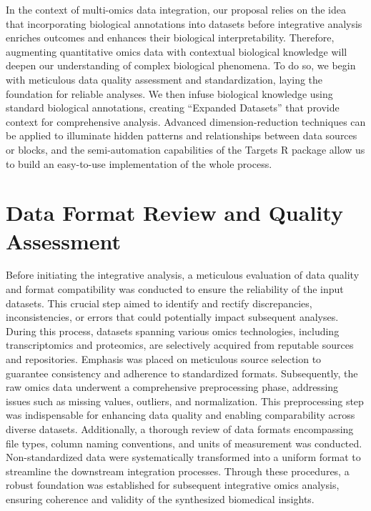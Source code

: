 \documentclass[a4paper, nobind]{templates/ociamthesis}
\renewcommand{\chaptermark}[1]{\markboth{\thechapter. #1}{\thechapter. #1}}
\begin{document}
\chaptermark{Methodology}

\minitoc 

In the context of multi-omics data integration, our proposal relies on the idea that incorporating biological annotations into datasets before integrative analysis enriches outcomes and enhances their biological interpretability. Therefore, augmenting quantitative omics data with contextual biological knowledge will deepen our understanding of complex biological phenomena. To do so, we begin with meticulous data quality assessment and standardization, laying the foundation for reliable analyses. We then infuse biological knowledge using standard biological annotations, creating ``Expanded Datasets'' that provide context for comprehensive analysis. Advanced dimension-reduction techniques can be applied to illuminate hidden patterns and relationships between data sources or blocks, and the semi-automation capabilities of the Targets R package allow us to build an easy-to-use implementation of the whole process.

\hypertarget{qa}{%
\section{Data Format Review and Quality Assessment}\label{qa}}

Before initiating the integrative analysis, a meticulous evaluation of data quality and format compatibility was conducted to ensure the reliability of the input datasets. This crucial step aimed to identify and rectify discrepancies, inconsistencies, or errors that could potentially impact subsequent analyses. During this process, datasets spanning various omics technologies, including transcriptomics and proteomics, are selectively acquired from reputable sources and repositories. Emphasis was placed on meticulous source selection to guarantee consistency and adherence to standardized formats. Subsequently, the raw omics data underwent a comprehensive preprocessing phase, addressing issues such as missing values, outliers, and normalization. This preprocessing step was indispensable for enhancing data quality and enabling comparability across diverse datasets. Additionally, a thorough review of data formats encompassing file types, column naming conventions, and units of measurement was conducted. Non-standardized data were systematically transformed into a uniform format to streamline the downstream integration processes. Through these procedures, a robust foundation was established for subsequent integrative omics analysis, ensuring coherence and validity of the synthesized biomedical insights.
\end{document}

